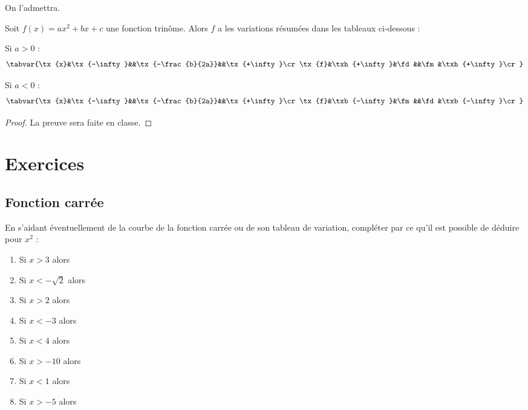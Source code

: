 On l'admettra.

\begin{prop}
Soit $f(x)=ax^2+bx+c$ une fonction trinôme. Alors $f$ a les variations résumées dans les tableaux ci-dessous :

\begin{itemize}\vspace{-1em}\begin{multicols}{2}
	\item Si $a>0$ :
	\[\tabvar{%
\tx{x}&\tx{-\infty}&&\tx{-\frac{b}{2a}}&&\tx{+\infty}\cr
\tx{f}&\txh{+\infty}&\fd&&\fm&\txh{+\infty}\cr
}\]
	\item Si $a<0$ :
	\[\tabvar{%
\tx{x}&\tx{-\infty}&&\tx{-\frac{b}{2a}}&&\tx{+\infty}\cr
\tx{f}&\txb{-\infty}&\fm&&\fd&\txb{-\infty}\cr
}\]
\end{multicols}\end{itemize}
\end{prop}

\begin{proof}La preuve sera faite en classe.
 \end{proof}
 
 \sautpage

\section{Exercices}

\subsection{Fonction carr\'ee}

\begin{exo}
 En s'aidant \'eventuellement de la courbe de la fonction carr\'ee ou de son tableau de variation, compl\'eter par ce qu'il est possible de d\'eduire pour $x^2$ :
  \vspace{-1em}\begin{multicols}{3}\begin{enumerate}
  \item Si $x>3$ alors 
  \item Si $x<-\sqrt{2}$ alors  \dotfill
  \item Si $x>2$ alors  \dotfill
  \item Si $x<-3$ alors  \dotfill
  \item Si $x<4$ alors  \dotfill
  \item Si $x>-10$ alors  \dotfill
  \item Si $x<1$ alors  \dotfill
  \item Si $x>-5$ alors  \dotfill
 \end{enumerate}\end{multicols}\vspace{-1em}
\end{exo}

